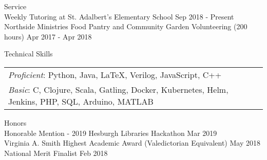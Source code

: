 \documentclass[10pt]{resume} %
\begin{document}
\begin{rSection}{Service}
\\ { Weekly Tutoring at St. Adalbert's Elementary School } \hfill { Sep 2018 - Present }
\\ { Northside Ministries Food Pantry and Community Garden Volunteering (200 hours) } \hfill { Apr 2017 - Apr 2018}
\end{rSection}


\begin{rSection}{Technical Skills}
\begin{tabular}{ @{} @{\hspace{1ex}} ll }
{\em Proficient}: Python, Java, LaTeX, Verilog, JavaScript, C++ \\ %
{\em Basic}: C, Clojure, Scala, Gatling, Docker, Kubernetes, Helm, Jenkins, PHP, SQL, Arduino, MATLAB  \\

\end{tabular}

\end{rSection}

\begin{rSection}{Honors}
\\ { Honorable Mention - 2019 Hesburgh Libraries Hackathon } \hfill { Mar 2019 }
\\ { Virginia A. Smith Highest Academic Award (Valedictorian Equivalent) } \hfill { May 2018 }
\\ { National Merit Finalist } \hfill { Feb 2018 }
\end{rSection}
\end{document}
